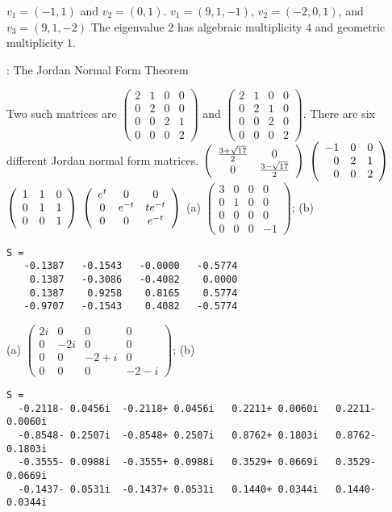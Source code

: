  \ans $v_1=(-1,1)$ and $v_2 = (0,1)$.
 \ans $v_1=(9,1,-1)$, $v_2=(-2,0,1)$, and $v_3=(9,1,-2)$
 \ans The eigenvalue $2$ has algebraic multiplicity $4$ 
and geometric multiplicity $1$.


: The Jordan Normal Form Theorem

\ans Two such matrices are 
$\left(\begin{array}{rrrr}
2 & 1 & 0 & 0 \\
0 & 2 & 0 & 0 \\
0 & 0 & 2 & 1 \\
0 & 0 & 0 & 2 \end{array}\right)$ and 
$\left(\begin{array}{rrrr}
2 & 1 & 0 & 0 \\
0 & 2 & 1 & 0 \\
0 & 0 & 2 & 0 \\
0 & 0 & 0 & 2 \end{array}\right).$
 \ans There are six different Jordan normal form matrices.
 \ans 
$\left(\begin{array}{cc} \frac{3 + \sqrt{17}}{2} & 0\\ 0 &\frac{3 - \sqrt{17}}{2}\end{array}\right)$
 \ans $\left(\begin{array}{rrr} -1 & 0 & 0 \\ 0 & 2 & 1 \\ 0 & 0 & 2\end{array}\right)$
 \ans $\left(\begin{array}{rrr} 1 & 1 & 0 \\ 0 & 1 & 1 \\ 0 & 0 & 1\end{array}\right)$
 \ans $\left(\begin{array}{ccc} e^t & 0 & 0 \\ 0 & e^{-t} & te^{-t} \\ 0 & 0 & e^{-t}\end{array}\right)$
  (a) \ans 
$\left(\begin{array}{rrrr}
3 & 0 & 0 & 0 \\
0 & 1 & 0 & 0 \\
0 & 0 & 0 & 0 \\
0 & 0 & 0 & -1 \end{array}\right)$;
(b) 
\begin{verbatim}
S =
   -0.1387   -0.1543   -0.0000   -0.5774
    0.1387   -0.3086   -0.4082    0.0000
    0.1387    0.9258    0.8165    0.5774
   -0.9707   -0.1543    0.4082   -0.5774
\end{verbatim}

 (a) \ans
\ans $\left(\begin{array}{cccc}
2i & 0 & 0 & 0 \\
0 & -2i & 0 & 0 \\
0 & 0 & -2 + i & 0 \\
0 & 0 & 0 & -2 - i \end{array}\right)$;
(b)
\begin{verbatim}
S =
  -0.2118- 0.0456i  -0.2118+ 0.0456i   0.2211+ 0.0060i   0.2211- 0.0060i
  -0.8548- 0.2507i  -0.8548+ 0.2507i   0.8762+ 0.1803i   0.8762- 0.1803i
  -0.3555- 0.0988i  -0.3555+ 0.0988i   0.3529+ 0.0669i   0.3529- 0.0669i
  -0.1437- 0.0531i  -0.1437+ 0.0531i   0.1440+ 0.0344i   0.1440- 0.0344i
\end{verbatim}

